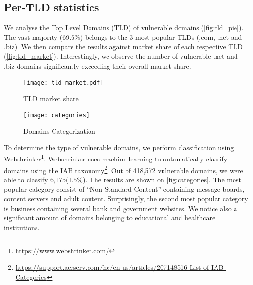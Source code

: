 % 



\subsection{Per-TLD statistics}

We analyse the Top Level Domains (TLD) of vulnerable domains (\autoref{fig:tld_pie}). The vast majority (69.6\%) belongs to the 3 most popular TLDs (.com, .net and .biz). We then compare the results against market share of each respective TLD (\autoref{fig:tld_market}). Interestingly, we observe the number of vulnerable .net and .biz domains significantly exceeding their overall market share. 


\begin{figure}[!hbt]
\centering
\texttt{[image: tld\_market.pdf]}
\caption{TLD market share}
\label{fig:tld_market}
\end{figure}



\begin{figure}[!hbt]
\centering
\texttt{[image: categories]}
\caption{Domains Categorization}
\label{fig:categories}
\end{figure}

To determine the type of vulnerable domains, we perform classification using Webshrinker\footnote{\url{https://www.webshrinker.com/}}. Webshrinker uses machine learning to automatically classify domains using the IAB taxonomy\footnote{\url{https://support.aerserv.com/hc/en-us/articles/207148516-List-of-IAB-Categories}}. Out of 418,572 vulnerable domains, we were able to classify 6,175(1.5\%). 
The results are shown on \autoref{fig:categories}. The most popular category consist of ``Non-Standard Content'' containing message boards, content servers and adult content. Surprisingly, the second most popular category is business containing several bank and government websites. We notice also a significant amount of domains belonging to educational and healthcare institutions. 

